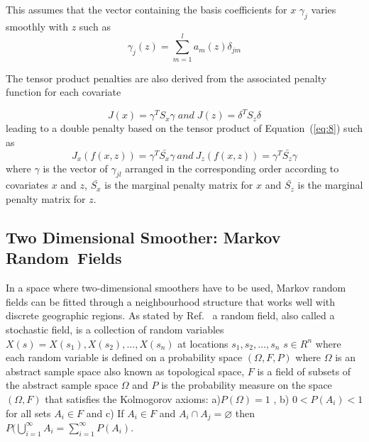 \documentclass[energies,article,accept,pdftex,moreauthors]{Definitions/mdpi}
\begin{document}
    This assumes that the vector containing the basis coefficients for $x$  $\gamma_{j}$ varies smoothly with $z$ such as
\begin{equation}
    \gamma_{j}(z)=\sum_{m=1}^{l}a_{m}(z) \delta_{jm}  
	\end{equation}
	
	The tensor product penalties are also derived from the associated penalty function for each covariate

\begin{equation}\label{eq:8}
	J(x)=\gamma^{T}S_{x}\gamma \; and \; J(z)=\delta^{T}S_{z}\delta
	\end{equation}
	leading to a double penalty based on the tensor product of Equation~(\ref{eq:8}) such as
\begin{equation}
	J_{x}(f(x,z))=\gamma^{T}\bar{S_{x}}\gamma \: and \: J_{z}(f(x,z))=\gamma^{T}\bar{S_{z}}\gamma
	\end{equation}
where $\gamma$ is the vector of $\gamma_{jl}$ arranged in the corresponding order according to covariates $x$ and $z$, $\bar{S_{x}}$ is the marginal penalty matrix for $x$ and $\bar{S_{z}}$ is the marginal penalty matrix for $z$. 

     \subsection{Two Dimensional Smoother: Markov Random~Fields}
     In a space where two-dimensional smoothers have to be used, Markov random fields can be fitted through a neighbourhood structure that works well with discrete geographic regions. 
     As stated by Ref.~\citep{Christakos2005RandomSciences} a random field, also called a stochastic field, is a collection of random variables \(X(s)={X(s_1),X(s_2),…,X(s_n)}\) at locations \(s_1,s_2,…,s_n\) \(s\in R^{n}\) where each random variable is defined on a probability space \((\Omega,F,P)\) where $\Omega$ is an abstract sample space also known as topological space, $F$ is a field of subsets of the abstract sample space $\Omega$ and $P$  is the probability measure on the space $(\Omega,F)$ that satisfies the Kolmogorov axioms: a)\(P(\Omega)=1\) , b) \(0<P(A_{i})<1\) for all sets \(A_{i} \in F\) and c) If \(A_{i} \in F\) and \(A_{i} \cap A_{j}=\varnothing\) then \(P(\bigcup_{i=1}^{\infty}A_{i} =\sum_{i=1}^{\infty}P(A_{i})\).
     
\end{document}
